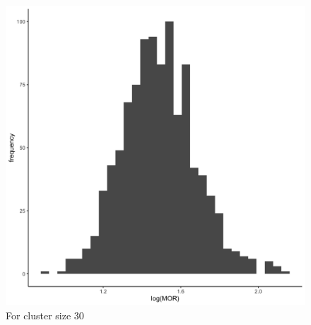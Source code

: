 \documentclass[
  letterpaper,
  DIV=11,
  numbers=noendperiod,
  titlepage]{scrartcl}
\begin{document}
\begin{figure}
\begin{minipage}[t]{0.50\linewidth}
{{\includegraphics{../../plots/two-lvl-ran-int/low-prev/hist_50_30_two_lvl_low_prev.png}

}

\caption{For cluster size 30}

}

\end{minipage}%
%
\begin{minipage}[t]{0.50\linewidth}

{\centering 

}
\end{minipage}
\end{figure}
\end{document}
